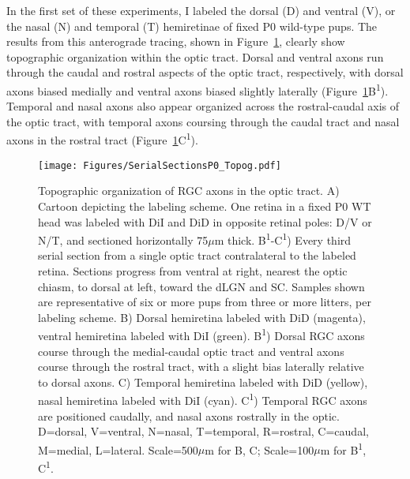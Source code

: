 In the first set of these experiments, I labeled the dorsal (D) and ventral (V), or the nasal (N) and temporal (T) hemiretinae of fixed P0 wild-type pups.
The results from this anterograde tracing, shown in Figure~\ref{Figures/SerialSectionsP0Topog}, clearly show topographic organization within the optic tract.
Dorsal and ventral axons run through the caudal and rostral aspects of the optic tract, respectively, with dorsal axons biased medially and ventral axons biased slightly laterally (Figure~\ref{Figures/SerialSectionsP0Topog}B\textsuperscript{1}).
Temporal and nasal axons also appear organized across the rostral-caudal axis of the optic tract, with temporal axons coursing through the caudal tract and nasal axons in the rostral tract (Figure~\ref{Figures/SerialSectionsP0Topog}C\textsuperscript{1}).
\begin{figure}[hbtp]
    \begin{center}
        \texttt{[image: Figures/SerialSectionsP0\_Topog.pdf]}
        \caption[Topographic organization of RGC axons in the optic tract.]
        {Topographic organization of RGC axons in the optic tract.
        A) Cartoon depicting the labeling scheme.
        One retina in a fixed P0 WT head was labeled with DiI and DiD in opposite retinal poles: D/V or N/T, and sectioned horizontally 75$\mu$m thick.
        B\textsuperscript{1}-C\textsuperscript{1}) Every third serial section from a single optic tract contralateral to the labeled retina.
        Sections progress from ventral at right, nearest the optic chiasm, to dorsal at left, toward the dLGN and SC.
        Samples shown are representative of six or more pups from three or more litters, per labeling scheme. %
        B) Dorsal hemiretina labeled with DiD (magenta), ventral hemiretina labeled with DiI (green).
        B\textsuperscript{1}) Dorsal RGC axons course through the medial-caudal optic tract and ventral axons course through the rostral tract, with a slight bias laterally relative to dorsal axons.
        C) Temporal hemiretina labeled with DiD (yellow), nasal hemiretina labeled with DiI (cyan).
        C\textsuperscript{1}) Temporal RGC axons are positioned caudally, and nasal axons rostrally in the optic.
        D=dorsal, V=ventral, N=nasal, T=temporal, R=rostral, C=caudal, M=medial, L=lateral.
        Scale=500$\mu$m for B, C; Scale=100$\mu$m for B\textsuperscript{1}, C\textsuperscript{1}.}
        \label{Figures/SerialSectionsP0Topog}
    \end{center}
\end{figure}

